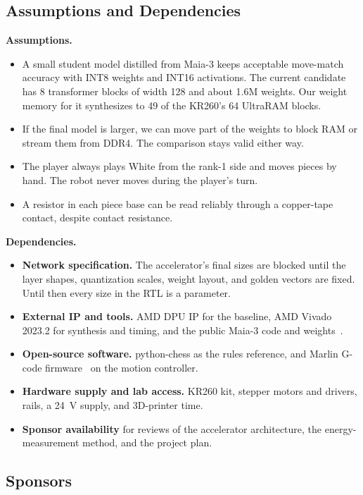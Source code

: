 \documentclass[10pt]{article}
\newcommand{\lead}[1]{\textbf{#1}}
\begin{document}
\subsection{Assumptions and Dependencies}

\lead{Assumptions.}
\begin{itemize}
\item A small student model distilled from Maia-3 keeps acceptable move-match accuracy with INT8
  weights and INT16 activations. The current candidate has 8 transformer blocks of width 128 and
  about 1.6M weights. Our weight memory for it synthesizes to 49 of the KR260's 64 UltraRAM blocks.
\item If the final model is larger, we can move part of the weights to block RAM or stream them
  from DDR4. The comparison stays valid either way.
\item The player always plays White from the rank-1 side and moves pieces by hand. The robot never
  moves during the player's turn.
\item A resistor in each piece base can be read reliably through a copper-tape contact, despite
  contact resistance.
\end{itemize}

\lead{Dependencies.}
\begin{itemize}
\item \lead{Network specification.} The accelerator's final sizes are blocked until the layer
  shapes, quantization scales, weight layout, and golden vectors are fixed. Until then every size
  in the RTL is a parameter.
\item \lead{External IP and tools.} AMD DPU IP for the baseline, AMD Vivado 2023.2 for synthesis
  and timing, and the public Maia-3 code and weights~\cite{maia3}.
\item \lead{Open-source software.} python-chess as the rules reference, and Marlin G-code
  firmware~\cite{marlin} on the motion controller.
\item \lead{Hardware supply and lab access.} KR260 kit, stepper motors and drivers, rails, a 24~V
  supply, and 3D-printer time.
\item \lead{Sponsor availability} for reviews of the accelerator architecture, the
  energy-measurement method, and the project plan.
\end{itemize}

\subsection{Sponsors}
\end{document}
